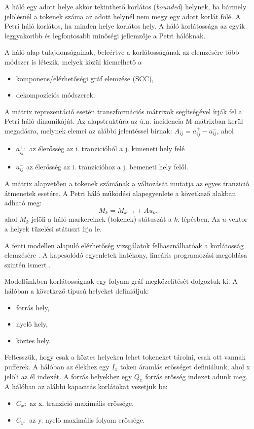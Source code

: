 
A háló egy adott helye akkor tekinthető korlátos (\textit{bounded}) helynek, ha bármely jelölésnél a tokenek száma az adott helynél nem megy egy adott korlát fölé. A Petri háló korlátos, ha minden helye korlátos hely.
A háló korlátossága az egyik leggyakoribb és legfontosabb minőségi jellemzője a Petri hálóknak. 

A háló alap tulajdonságainak, beleértve a korlátosságának az elemzésére több módszer is létezik, melyek közül kiemelhető a
\begin{itemize}
\item komponens/elérhetőségi gráf elemzése (SCC),
\item dekompozíciós módszerek.
\end{itemize}

A mátrix reprezentáció esetén transzformációs mátrixok segítségével írják fel a Petri háló dinamikáját. Az alapstruktúra az ú.n. incidencia M mátrixban kerül megadásra, melynek elemei az alábbi jelentéssel bírnak: $A_{ij}=a^+_{ij}-a^-_{ij}$, ahol 
\begin{itemize}
\item $a^+_{ij}: $ az élerősség az i. tranzicióból a j. kimeneti hely felé
\item $a^-_{ij}$ az élerősség az i. tranzicióhoz a j. bemeneti hely felől.
\end{itemize}

A mátrix alapvetően a tokenek számának a változását mutatja az egyes tranzició átmenetek esetére. A  Petri háló működési alapegyenlete a következő alakban adható meg: 
$$M_k=M_{k-1}+ Au_k,$$
ahol $M_k$ jelöli a háló markereinek (tokenek) státuszát a $k.$ lépésben. Az $u$ vektor a helyek tüzelési státuszt írja le. 

A fenti modellen alapuló elérhetőség vizsgálatok felhasználhatóak a korlátosság elemzésére \cite{murata1989petri}.
A kapcsolódó  egyenletek hatékony, lineáris programozási megoldása szintén ismert \cite{lasserre1989using}.


Modellünkben korlátosságnak egy folyam-gráf megközelítését dolgoztuk ki.  A hálóban a következő típusú helyeket definiáljuk:
\begin{itemize}
\item forrás hely,
\item nyelő hely,
\item köztes hely.
\end{itemize}
Feltesszük, hogy csak a köztes helyeken lehet tokeneket tárolni, csak ott vannak pufferek. A hálóban az élekhez egy $I_x$ token áramlás erősséget definiálunk, ahol x jelöli az él indexét. A forrás helyekhez egy $Q_x$ forrás erősség indexet adunk meg. A hálóban az alábbi kapacitás korlátokat vezetjük be:
\begin{itemize}
\item $C_x:$ az x. tranzició maximális erőssége,
\item $C_y:$ az y. nyelő maximális folyam erőssége.
\end{itemize}

